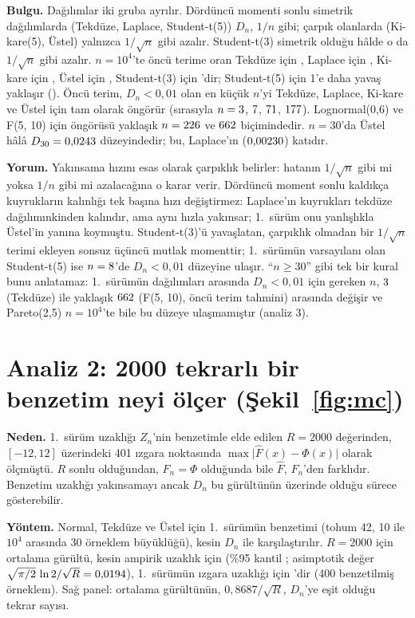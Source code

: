 \documentclass[11pt,a4paper]{article}
\begin{document}
\textbf{Bulgu.} Dağılımlar iki gruba ayrılır. Dördüncü momenti sonlu simetrik dağılımlarda (Tekdüze, Laplace, Student-t(5)) $D_n$,
$1/n$ gibi; çarpık olanlarda (Ki-kare(5), Üstel) yalnızca $1/\sqrt n$ gibi azalır. Student-t(3) simetrik olduğu hâlde o da
$1/\sqrt n$ gibi azalır. $n = 10^4$'te öncü terime oran Tekdüze için \UniRatio{}, Laplace için \LapRatio{}, Ki-kare için \ChiRatio{},
Üstel için \ExpRatio{}, Student-t(3) için \TThreeRatio{}'dir; Student-t(5) için 1'e daha yavaş yaklaşır (\TFiveRatio{}). Öncü terim,
$D_n < 0{,}01$ olan en küçük $n$'yi Tekdüze, Laplace, Ki-kare ve Üstel için tam olarak öngörür (sırasıyla $n = 3$, $7$,
$71$, $177$). Lognormal(0,6) ve F(5, 10) için öngörüsü yaklaşık $n = 226$ ve $662$ biçimindedir. $n = 30$'da
Üstel hâlâ $D_{30} = 0{,}0243$ düzeyindedir; bu, Laplace'ın ($0{,}00230$) \ExpOverLap{} katıdır.

\textbf{Yorum.} Yakınsama hızını esas olarak çarpıklık belirler: hatanın $1/\sqrt n$ gibi mi yoksa $1/n$ gibi mi azalacağına o karar
verir. Dördüncü moment sonlu kaldıkça kuyrukların kalınlığı tek başına hızı değiştirmez: Laplace'ın kuyrukları tekdüze dağılımınkinden
kalındır, ama aynı hızla yakınsar; 1.\ sürüm onu yanlışlıkla Üstel'in yanına koymuştu. Student-t(3)'ü yavaşlatan, çarpıklık olmadan
bir $1/\sqrt n$ terimi ekleyen sonsuz üçüncü mutlak momenttir; 1.\ sürümün varsayılanı olan Student-t(5) ise $n = 8$'de
$D_n < 0{,}01$ düzeyine ulaşır. ``$n \ge 30$'' gibi tek bir kural bunu anlatamaz: 1.\ sürümün dağılımları arasında $D_n < 0{,}01$ için
gereken $n$, $3$ (Tekdüze) ile yaklaşık $662$ (F(5, 10), öncü terim tahmini) arasında değişir ve Pareto(2,5) $n = 10^4$'te
bile bu düzeye ulaşmamıştır (analiz 3).

\section{Analiz 2: 2000 tekrarlı bir benzetim neyi ölçer (Şekil~\ref{fig:mc})}

\textbf{Neden.} 1.\ sürüm uzaklığı $Z_n$'nin benzetimle elde edilen $R = 2000$ değerinden, $[-12, 12]$ üzerindeki 401 ızgara
noktasında $\max\lvert\hat F(x) - \Phi(x)\rvert$ olarak ölçmüştü. $R$ sonlu olduğundan, $F_n = \Phi$ olduğunda bile $\hat F$, $F_n$'den
farklıdır. Benzetim uzaklığı yakınsamayı ancak $D_n$ bu gürültünün üzerinde olduğu sürece gösterebilir.

\textbf{Yöntem.} Normal, Tekdüze ve Üstel için 1.\ sürümün benzetimi (tohum 42, 10 ile $10^4$ arasında 30 örneklem büyüklüğü), kesin
$D_n$ ile karşılaştırılır. $R = 2000$ için ortalama gürültü, kesin ampirik uzaklık için \NoiseExact{} (\%95 kantil \NoiseQ{}; asimptotik
değer $\sqrt{\pi/2}\,\ln 2/\sqrt R = 0{,}0194$), 1.\ sürümün ızgara uzaklığı için \NoiseGrid{}'dir (400 benzetilmiş örneklem). Sağ
panel: ortalama gürültünün, $0{,}8687/\sqrt R$, $D_n$'ye eşit olduğu tekrar sayısı.
\end{document}
